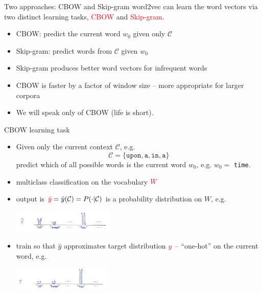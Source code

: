 \documentclass{beamer}
\newcommand{\word}[1]{\texttt{#1}}
\newcommand{\currentword}{{w_0}}
\newcommand{\context}{\mathcal{C}}
\newcommand{\vocabulary}{W}
\newcommand{\p}{P}
\newcommand{\prediction}{\hat{y}}
\newcommand{\target}{y}
\begin{document}
\begin{frame}{Two approaches: CBOW and Skip-gram}
word2vec can learn the word vectors via two distinct learning tasks, \textcolor{red}{CBOW} and \textcolor{red}{Skip-gram}.
\begin{itemize}
\item CBOW: predict the current word $\currentword$ given only $\context$
\item Skip-gram: predict words from $\context$ given $\currentword$
\item Skip-gram produces better word vectors for infrequent words
\item CBOW is faster by a factor of window size -- more appropriate for larger corpora
\item We will speak only of CBOW (life is short).
\end{itemize}
\end{frame}

\begin{frame}{CBOW learning task}
\begin{itemize}
	\item Given only the current context $\context$, e.g. $$\context = \{\word{upon}, \word{a}, \word{in}, \word{a}\}$$   predict which of all possible words is the current word $\currentword$, e.g. $\currentword =$ \word{time}.
	\item multiclass classification on the vocabulary $\textcolor{red}{\vocabulary}$
	\item output is $\textcolor{red}{\prediction} = \prediction (\context) = \p ( \cdot | \context)$ is a probability distribution on $\vocabulary$, e.g.
		\begin{center}
			\includegraphics[height=40px]{prediction}
		\end{center}
	\item train so that $\prediction$ approximates target distribution $\textcolor{red}{\target}$ -- ``one-hot'' on the current word, e.g.
		\begin{center}
			\includegraphics[height=40px]{target}
		\end{center}
\end{itemize}
\end{frame}
\end{document}
